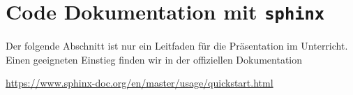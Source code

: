 \newpage
\section{Code Dokumentation mit	\texttt{sphinx}}

Der folgende Abschnitt ist nur ein Leitfaden für die Präsentation im Unterricht. Einen geeigneten Einstieg finden wir in der offiziellen Dokumentation 
\begin{center}
	\url{https://www.sphinx-doc.org/en/master/usage/quickstart.html}
\end{center}



%
%
%
%	
%		
%			
